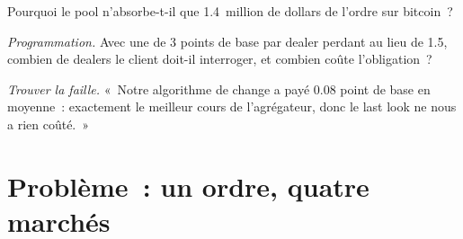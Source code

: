 \begin{exercise}[$\star\star$]\label{exo:mx:execution-beyond-equities:6}
Pourquoi le pool n'absorbe-t-il que 1.4~million de dollars de l'ordre sur bitcoin~?
\end{exercise}

\begin{exercise}[$\star\star\star$]\label{exo:mx:execution-beyond-equities:7}
\emph{Programmation.} Avec une  de 3 points de base par dealer perdant au lieu de 1.5, combien de dealers le client doit-il interroger, et combien coûte l'obligation~?
\end{exercise}

\begin{exercise}[$\star\star\star$]\label{exo:mx:execution-beyond-equities:8}
\emph{Trouver la faille.} «~Notre algorithme de change a payé 0.08 point de base en moyenne~: exactement le meilleur cours de l'agrégateur, donc le last look ne nous a rien coûté.~»
\end{exercise}

\section{Problème~: un ordre, quatre marchés}


